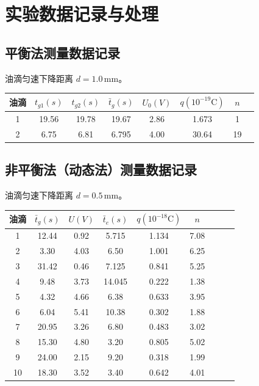 \documentclass[12pt,a4paper]{article}
\begin{document}
	\section{实验数据记录与处理}
	
	\subsection{平衡法测量数据记录}
	油滴匀速下降距离 $d = 1.0\,\text{mm}$。
	\begin{table}[htbp]
		\centering
		\begin{tabular}{cccccccc}
			\toprule
			油滴 & $t_{g1}(s)$ & $t_{g2}(s)$ & $\bar{t}_g(s)$ & $U_0(V)$ & $q(10^{-19}\text{C})$ & $n$  \\
			\midrule
			1 & 19.56 & 19.78 & 19.67 & 2.86 & 1.673 & 1  \\
			2 & 6.75 & 6.81 & 6.795 & 4.00 & 30.64 & 19   \\
			\bottomrule
		\end{tabular}
	\end{table}
	
	\subsection{非平衡法（动态法）测量数据记录}
	油滴匀速下降距离 $d = 0.5\,\text{mm}$。
	\begin{table}[htbp]
		\centering
		\small
		\begin{tabular}{ccccccccc}
			\toprule
			油滴 & $\bar{t}_g(s)$ & $U(V)$ & $\bar{t}_e(s)$ & $q(10^{-18}\text{C})$ & $n$  \\
			\midrule
			1 & 12.44 & 0.92 & 5.715 & 1.134 & 7.08 \\
			2 & 3.30 & 4.03 &  6.50 & 1.001 & 6.25 \\
			3 & 31.42 & 0.46 &7.125 & 0.841 & 5.25 \\
			4 & 9.48 & 3.73 & 14.045 & 0.222 & 1.38 \\
			5 & 4.32 & 4.66  & 6.38 & 0.633 & 3.95  \\
			6 & 6.04 & 5.41  & 10.38 & 0.302 & 1.88  \\
			7 & 20.95 & 3.26 & 6.80 & 0.483 & 3.02  \\
			8 & 15.30 & 4.80 & 3.20 & 0.805 & 5.02  \\
			9 & 24.00 & 2.15  & 9.20 & 0.318 & 1.99  \\
			10 & 18.30 & 3.52 & 3.40 & 0.642 & 4.01  \\
			\bottomrule
		\end{tabular}
	\end{table}
	
\end{document}
